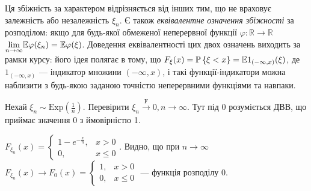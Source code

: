 \begin{enumerate}
    Ця збіжність за характером відрізняється від інших тим, що не враховує залежність або незалежність $\xi_n$.
    Є також \emph{еквівалентне означення збіжності} за розподілом: якщо для будь-якої обмеженої неперервної функції $\varphi : \mathbb{R} \to \mathbb{R}$
    $\underset{n \to \infty}{\lim} \mathbb{E} \varphi(\xi_n) = \mathbb{E}\varphi(\xi)$.
    Доведення еквівалентності цих двох означень виходить за рамки курсу: його ідея полягає в тому, що $F_{\xi}(x) = \mathbb{P}\left\{ \xi < x\right\} = \mathbb{E} 1_{(-\infty, x)}(\xi)$,
    де $1_{(-\infty, x)}$ --- індикатор множини $(-\infty, x)$, і такі функції-індикатори можна наблизити з будь-якою заданою точністю неперервними функціями та навпаки.
    \begin{example}
        Нехай $\xi_n \sim \mathrm{Exp}(\frac{1}{n})$. Перевірити $\xi_n \overset{\mathrm{F}}{\to} 0, n \to \infty$.
        Тут під 0 розуміється ДВВ, що приймає значення 0 з ймовірністю 1.

        $F_{\xi_n}(x) = \begin{cases}
            1 - e^{-\frac{x}{n}}, & x > 0 \\
            0, & x \leq 0
        \end{cases}$. Видно, що при $n \to \infty$ $F_{\xi_n}(x) \to F_0(x) = \begin{cases}
            1, & x > 0 \\
            0, & x \leq 0
        \end{cases}
        $ --- функція розподілу 0.
    \end{example}
\end{enumerate}

